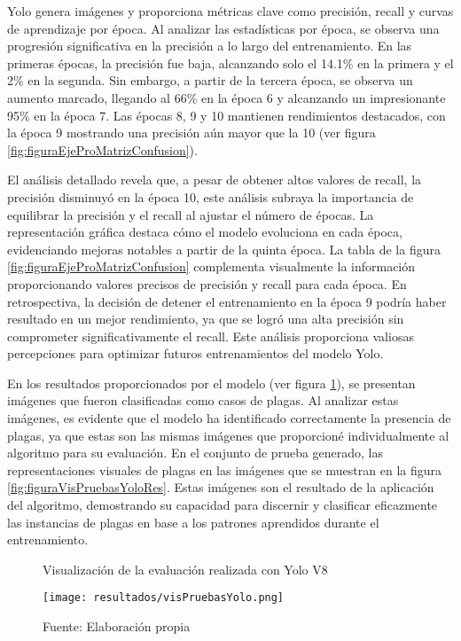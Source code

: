 Yolo genera imágenes y proporciona métricas clave como precisión, recall y curvas de aprendizaje por época. Al analizar las estadísticas por época, se observa una progresión significativa en la precisión a lo largo del entrenamiento. En las primeras épocas, la precisión fue baja, alcanzando solo el 14.1\% en la primera y el 2\% en la segunda. Sin embargo, a partir de la tercera época, se observa un aumento marcado, llegando al 66\% en la época 6 y alcanzando un impresionante 95\% en la época 7. Las épocas 8, 9 y 10 mantienen rendimientos destacados, con la época 9 mostrando una precisión aún mayor que la 10 (ver figura \ref{fig:figuraEjeProMatrizConfusion}). \newline

El análisis detallado revela que, a pesar de obtener altos valores de recall, la precisión disminuyó en la época 10, este análisis subraya la importancia de equilibrar la precisión y el recall al ajustar el número de épocas. La representación gráfica destaca cómo el modelo evoluciona en cada época, evidenciando mejoras notables a partir de la quinta época. La tabla de la figura \ref{fig:figuraEjeProMatrizConfusion} complementa visualmente la información proporcionando valores precisos de precisión y recall para cada época. En retrospectiva, la decisión de detener el entrenamiento en la época 9 podría haber resultado en un mejor rendimiento, ya que se logró una alta precisión sin comprometer significativamente el recall. Este análisis proporciona valiosas percepciones para optimizar futuros entrenamientos del modelo Yolo. \newline

En los resultados proporcionados por el modelo (ver figura \ref{fig:figuraVisPruebasYolo}), se presentan imágenes que fueron clasificadas como casos de plagas. Al analizar estas imágenes, es evidente que el modelo ha identificado correctamente la presencia de plagas, ya que estas son las mismas imágenes que proporcioné individualmente al algoritmo para su evaluación. En el conjunto de prueba generado, las representaciones visuales de plagas en las imágenes que se muestran en la figura \ref{fig:figuraVisPruebasYoloRes}. Estas imágenes son el resultado de la aplicación del algoritmo, demostrando su capacidad para discernir y clasificar eficazmente las instancias de plagas en base a los patrones aprendidos durante el entrenamiento.

\newpage

\begin{figure}[h]
\centering
\caption{Visualización de la evaluación realizada con Yolo V8}
\texttt{[image: resultados/visPruebasYolo.png]}
\caption*{\footnotesize Fuente: Elaboración propia}
\label{fig:figuraVisPruebasYolo}
\end{figure}

